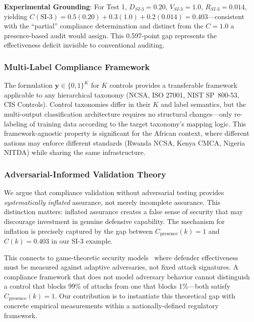\documentclass[futureinternet,article,submit,pdftex,moreauthors]{Definitions/mdpi}
\begin{document}
\textbf{Experimental Grounding}: For Test 1, $D_{SI\text{-}3} = 0.20$, $V_{SI\text{-}3} = 1.0$,
$R_{SI\text{-}3} = 0.014$, yielding
$C(\text{SI-3}) = 0.5(0.20) + 0.3(1.0) + 0.2(0.014) = 0.403$---consistent with the
``partial'' compliance determination and distinct from the $C = 1.0$ a presence-based audit
would assign. This 0.597-point gap represents the effectiveness deficit invisible to
conventional auditing.

\subsubsection{Multi-Label Compliance Framework}

The formulation $\mathbf{y} \in \{0,1\}^K$ for $K$ controls provides a transferable
framework applicable to any hierarchical taxonomy (NCSA, ISO 27001, NIST SP~800-53, CIS
Controls). Control taxonomies differ in their $K$ and label semantics, but the multi-output
classification architecture requires no structural changes---only re-labeling of training data
according to the target taxonomy's mapping logic. This framework-agnostic property is
significant for the African context, where different nations may enforce different standards
(Rwanda NCSA, Kenya CMCA, Nigeria NITDA) while sharing the same infrastructure.

\subsubsection{Adversarial-Informed Validation Theory}

We argue that compliance validation without adversarial testing provides \textit{systematically
inflated} assurance, not merely incomplete assurance. This distinction matters: inflated
assurance creates a false sense of security that may discourage investment in genuine
defensive capability. The mechanism for inflation is precisely captured by the gap between
$C_{\text{presence}}(k) = 1$ and $C(k) = 0.403$ in our SI-3 example.

This connects to game-theoretic security models~\cite{mitre_attack_applications} where
defender effectiveness must be measured against adaptive adversaries, not fixed attack
signatures. A compliance framework that does not model adversary behavior cannot distinguish
a control that blocks 99\% of attacks from one that blocks 1\%---both satisfy
$C_{\text{presence}}(k) = 1$. Our contribution is to instantiate this theoretical gap with
concrete empirical measurements within a nationally-defined regulatory framework.
\end{document}
